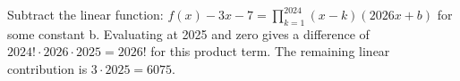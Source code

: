 Subtract the linear function: $f(x)-3x-7=\prod_{k=1}^{2024}(x-k)(2026x+b)$ for some constant b. Evaluating at 2025 and zero gives a difference of $2024!\cdot2026\cdot2025=2026!$ for this product term. The remaining linear contribution is $3\cdot2025=\boxed{6075}$.
